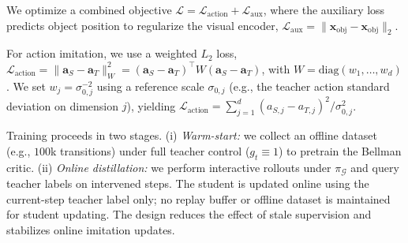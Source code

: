We optimize a combined objective
$\mathcal{L}=\mathcal{L}_{\mathrm{action}}+\mathcal{L}_{\mathrm{aux}}$, where the
auxiliary loss predicts object position to regularize the visual encoder,
$\mathcal{L}_{\mathrm{aux}}=\lVert
\hat{\mathbf{x}}_{\mathrm{obj}}-\mathbf{x}_{\mathrm{obj}}\rVert_2$.

For action imitation, we use a weighted $L_2$ loss,
$\mathcal{L}_{\mathrm{action}}
=\lVert\mathbf{a}_S-\mathbf{a}_T\rVert_W^2
=(\mathbf{a}_S-\mathbf{a}_T)^\top W(\mathbf{a}_S-\mathbf{a}_T)$,
with $W=\mathrm{diag}(w_1,\dots,w_d)$. We set
$w_j=\sigma_{0,j}^{-2}$ using a reference scale $\sigma_{0,j}$ (e.g., the
teacher action standard deviation on dimension $j$), yielding
$\mathcal{L}_{\mathrm{action}}=
\sum_{j=1}^{d}(a_{S,j}-a_{T,j})^2/\sigma_{0,j}^{2}$.

Training proceeds in two stages. (i) \emph{Warm-start:} we collect an offline
dataset (e.g., $100$k transitions) under full teacher control ($g_t\equiv 1$)
to pretrain the Bellman critic. (ii) \emph{Online
distillation:} we perform interactive rollouts under $\pi_{\mathcal{G}}$ and
query teacher labels on intervened steps. The student is updated online using
the current-step teacher label only; no replay buffer or offline dataset is
maintained for student updating. The design reduces the
effect of stale supervision and stabilizes online imitation updates.
